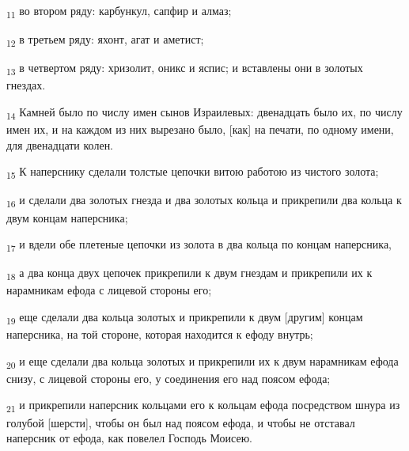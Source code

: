 \begin{tcolorbox}
\textsubscript{11} во втором ряду: карбункул, сапфир и алмаз;
\end{tcolorbox}
\begin{tcolorbox}
\textsubscript{12} в третьем ряду: яхонт, агат и аметист;
\end{tcolorbox}
\begin{tcolorbox}
\textsubscript{13} в четвертом ряду: хризолит, оникс и яспис; и вставлены они в золотых гнездах.
\end{tcolorbox}
\begin{tcolorbox}
\textsubscript{14} Камней было по числу имен сынов Израилевых: двенадцать было их, по числу имен их, и на каждом из них вырезано было, [как] на печати, по одному имени, для двенадцати колен.
\end{tcolorbox}
\begin{tcolorbox}
\textsubscript{15} К наперснику сделали толстые цепочки витою работою из чистого золота;
\end{tcolorbox}
\begin{tcolorbox}
\textsubscript{16} и сделали два золотых гнезда и два золотых кольца и прикрепили два кольца к двум концам наперсника;
\end{tcolorbox}
\begin{tcolorbox}
\textsubscript{17} и вдели обе плетеные цепочки из золота в два кольца по концам наперсника,
\end{tcolorbox}
\begin{tcolorbox}
\textsubscript{18} а два конца двух цепочек прикрепили к двум гнездам и прикрепили их к нарамникам ефода с лицевой стороны его;
\end{tcolorbox}
\begin{tcolorbox}
\textsubscript{19} еще сделали два кольца золотых и прикрепили к двум [другим] концам наперсника, на той стороне, которая находится к ефоду внутрь;
\end{tcolorbox}
\begin{tcolorbox}
\textsubscript{20} и еще сделали два кольца золотых и прикрепили их к двум нарамникам ефода снизу, с лицевой стороны его, у соединения его над поясом ефода;
\end{tcolorbox}
\begin{tcolorbox}
\textsubscript{21} и прикрепили наперсник кольцами его к кольцам ефода посредством шнура из голубой [шерсти], чтобы он был над поясом ефода, и чтобы не отставал наперсник от ефода, как повелел Господь Моисею.
\end{tcolorbox}
